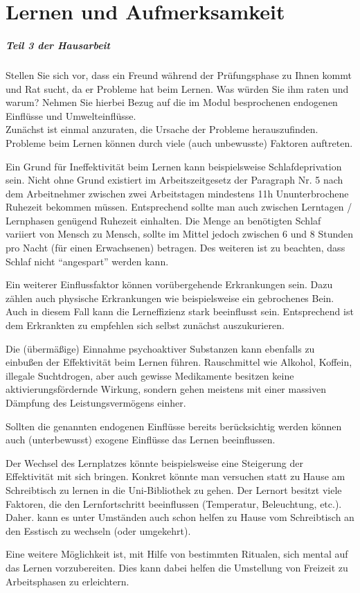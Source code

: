 %
\chapter{Lernen und Aufmerksamkeit}
\label{sec:lernen-und-aufmerksamkeit}

\paragraph{Teil 3 der Hausarbeit}
Stellen Sie sich vor, dass ein Freund während der Prüfungsphase zu Ihnen kommt und Rat sucht, da er Probleme hat beim Lernen. Was würden Sie ihm raten und warum? Nehmen Sie hierbei Bezug auf die im Modul besprochenen endogenen Einflüsse und Umwelteinflüsse. \\[0.4em]

Zunächst ist einmal anzuraten, die Ursache der Probleme herauszufinden. Probleme beim Lernen können durch viele (auch unbewusste) Faktoren auftreten.

Ein Grund für Ineffektivität beim Lernen kann beispielsweise Schlafdeprivation sein. Nicht ohne Grund existiert im Arbeitszeitgesetz der Paragraph Nr. 5 nach dem Arbeitnehmer zwischen zwei Arbeitstagen mindestens 11h Ununterbrochene Ruhezeit bekommen müssen. Entsprechend sollte man auch zwischen Lerntagen / Lernphasen genügend Ruhezeit einhalten. Die Menge an benötigten Schlaf variiert von Mensch zu Mensch, sollte im Mittel jedoch zwischen 6 und 8 Stunden pro Nacht (für einen Erwachsenen) betragen.
Des weiteren ist zu beachten, dass Schlaf nicht “angespart” werden kann.

Ein weiterer Einflussfaktor können vorübergehende Erkrankungen sein. Dazu zählen auch physische Erkrankungen wie beispielsweise ein gebrochenes Bein. Auch in diesem Fall kann die Lerneffizienz stark beeinflusst sein. Entsprechend ist dem Erkrankten zu empfehlen sich selbst zunächst auszukurieren.

Die (übermäßige) Einnahme psychoaktiver Substanzen kann ebenfalls zu einbußen der Effektivität beim Lernen führen. Rauschmittel wie Alkohol, Koffein, illegale Suchtdrogen, aber auch gewisse Medikamente besitzen keine aktivierungsfördernde Wirkung, sondern gehen meistens mit einer massiven Dämpfung des Leistungsvermögens einher.

Sollten die genannten endogenen Einflüsse bereits berücksichtig werden können auch (unterbewusst) exogene Einflüsse das Lernen beeinflussen.

Der Wechsel des Lernplatzes könnte beispielsweise eine Steigerung der Effektivität mit sich bringen. Konkret könnte man versuchen statt zu Hause am Schreibtisch zu lernen in die Uni-Bibliothek zu gehen. Der Lernort besitzt viele Faktoren, die den Lernfortschritt beeinflussen (Temperatur, Beleuchtung, etc.). Daher. kann es unter Umständen auch schon helfen zu Hause vom Schreibtisch an den Esstisch zu wechseln (oder umgekehrt).

Eine weitere Möglichkeit ist, mit Hilfe von bestimmten Ritualen, sich mental auf das Lernen vorzubereiten. Dies kann dabei helfen die Umstellung von Freizeit zu Arbeitsphasen zu erleichtern.
